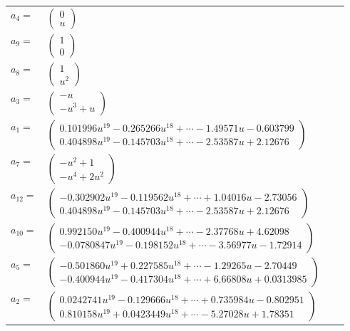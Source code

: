 \documentclass[1p]{elsarticle_modified}
\theoremstyle{definition}
\begin{document}
\begin{tabular}{m{7pt} m{180pt} m{7pt} m{180pt} }
\flushright $a_{4}=$&$\begin{pmatrix}0\\u\end{pmatrix}$ \\
\flushright $a_{9}=$&$\begin{pmatrix}1\\0\end{pmatrix}$ \\
\flushright $a_{8}=$&$\begin{pmatrix}1\\u^2\end{pmatrix}$ \\
\flushright $a_{3}=$&$\begin{pmatrix}- u\\- u^3+u\end{pmatrix}$ \\
\flushright $a_{1}=$&$\begin{pmatrix}0.101996 u^{19}-0.265266 u^{18}+\cdots-1.49571 u-0.603799\\0.404898 u^{19}-0.145703 u^{18}+\cdots-2.53587 u+2.12676\end{pmatrix}$ \\
\flushright $a_{7}=$&$\begin{pmatrix}- u^2+1\\- u^4+2 u^2\end{pmatrix}$ \\
\flushright $a_{12}=$&$\begin{pmatrix}-0.302902 u^{19}-0.119562 u^{18}+\cdots+1.04016 u-2.73056\\0.404898 u^{19}-0.145703 u^{18}+\cdots-2.53587 u+2.12676\end{pmatrix}$ \\
\flushright $a_{10}=$&$\begin{pmatrix}0.992150 u^{19}-0.400944 u^{18}+\cdots-2.37768 u+4.62098\\-0.0780847 u^{19}-0.198152 u^{18}+\cdots-3.56977 u-1.72914\end{pmatrix}$ \\
\flushright $a_{5}=$&$\begin{pmatrix}-0.501860 u^{19}+0.227585 u^{18}+\cdots-1.29265 u-2.70449\\-0.400944 u^{19}-0.417304 u^{18}+\cdots+6.66808 u+0.0313985\end{pmatrix}$ \\
\flushright $a_{2}=$&$\begin{pmatrix}0.0242741 u^{19}-0.129666 u^{18}+\cdots+0.735984 u-0.802951\\0.810158 u^{19}+0.0423449 u^{18}+\cdots-5.27028 u+1.78351\end{pmatrix}$ \\

\end{tabular}
\end{document}
